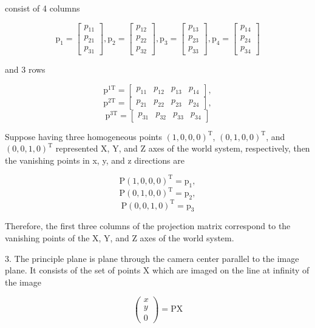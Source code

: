\documentclass[conference]{IEEEtran}
\begin{document}
consist of 4 columns 

\[ \mathrm{p_1} = \begin{bmatrix}
p_{11} \\
p_{21} \\
p_{31} 
\end{bmatrix},
\mathrm{p_2} = \begin{bmatrix}
p_{12} \\
p_{22} \\
p_{32} 
\end{bmatrix},
\mathrm{p_3} = \begin{bmatrix}
p_{13} \\
p_{23} \\
p_{33} 
\end{bmatrix},
\mathrm{p_4} = \begin{bmatrix}
p_{14} \\
p_{24} \\
p_{34} 
\end{bmatrix}
\]

and 3 rows

\[ \mathrm{p}^{1\mathrm{T}} = \begin{bmatrix}
p_{11} & p_{12} & p_{13} & p_{14}  
\end{bmatrix}, \]
\[ \mathrm{p}^{2\mathrm{T}} = \begin{bmatrix}
p_{21} & p_{22} & p_{23} & p_{24}  
\end{bmatrix}, \]
\[ \mathrm{p}^{3\mathrm{T}} = \begin{bmatrix} 
p_{31} & p_{32} & p_{33} & p_{34}  
\end{bmatrix}
\]

Suppose having three homogeneous points \( (1, 0 , 0, 0)^\mathrm{T} \), \( (0, 1 , 0, 0)^\mathrm{T} \), and \( (0, 0 , 1, 0)^\mathrm{T} \) represented X, Y, and Z axes of the world system, respectively, then the vanishing points in x, y, and z directions are

\[ \mathrm{P}(1, 0 , 0, 0)^\mathrm{T} = \mathrm{p_1}, \] 
\[ \mathrm{P}(0, 1 , 0, 0)^\mathrm{T} = \mathrm{p_2}, \] 
\[ \mathrm{P}(0, 0 , 1, 0)^\mathrm{T} = \mathrm{p_3} \] 

Therefore, the first three columns of the projection matrix correspond to the vanishing points of the X, Y, and Z axes of the world system.

3. The principle plane is plane through the camera center parallel to the image plane. It consists of the set of points X which are imaged on the line at infinity of the image

\[  \begin{pmatrix} x\\y\\0 \end{pmatrix} = \mathrm{P}\mathrm{X} \]
\end{document}
